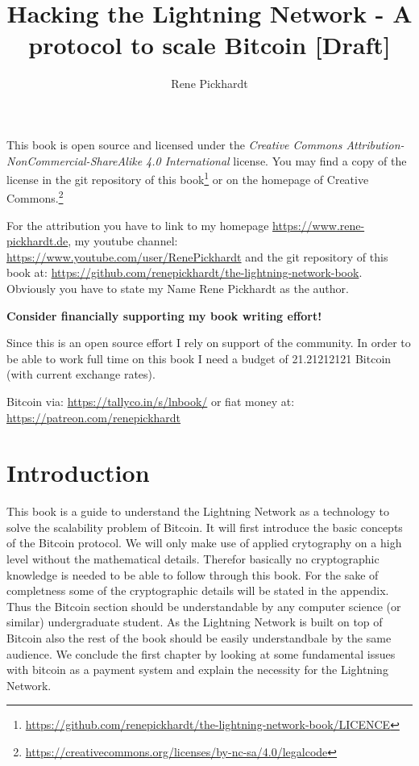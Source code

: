 \documentclass[ebook,12pt,oneside,openany]{memoir}
\title{Hacking the Lightning Network - A protocol to scale Bitcoin [Draft]}
\author{Rene Pickhardt}
\begin{document}
\maketitle

\newpage
This book is open source and licensed under the \textit{Creative Commons Attribution-NonCommercial-ShareAlike 4.0 International} license. You may find a copy of the license in the git repository of this book\footnote{\url{https://github.com/renepickhardt/the-lightning-network-book/LICENCE}} or on the homepage of Creative Commons.\footnote{\url{https://creativecommons.org/licenses/by-nc-sa/4.0/legalcode}}

For the attribution you have to link to my homepage \url{https://www.rene-pickhardt.de}, my youtube channel: \url{https://www.youtube.com/user/RenePickhardt} and the git repository of this book at: \url{https://github.com/renepickhardt/the-lightning-network-book}. Obviously you have to state my Name Rene Pickhardt as the author.

\textbf{Consider financially supporting my book writing effort!}

Since this is an open source effort I rely on support of the community. In order to be able to work full time on this book I need a budget of 21.21212121 Bitcoin (with current exchange rates).

Bitcoin via: \url{https://tallyco.in/s/lnbook/} or fiat money at:  \url{https://patreon.com/renepickhardt}


\newpage
\tableofcontents
\newpage

\chapter{Introduction}
This book is a guide to understand the Lightning Network as a technology to solve the scalability problem of Bitcoin.
It will first introduce the basic concepts of the Bitcoin protocol.
We will only make use of applied crytography on a high level without the mathematical details. 
Therefor basically no cryptographic knowledge is needed to be able to follow through this book.
For the sake of completness some of the cryptographic details will be stated in the appendix.
Thus the Bitcoin section should be understandable by any computer science (or similar) undergraduate student.
As the Lightning Network is built on top of Bitcoin also the rest of the book should be easily understandbale by the same audience.
We conclude the first chapter by looking at some fundamental issues with bitcoin as a payment system and explain the necessity for the Lightning Network.
\end{document}
